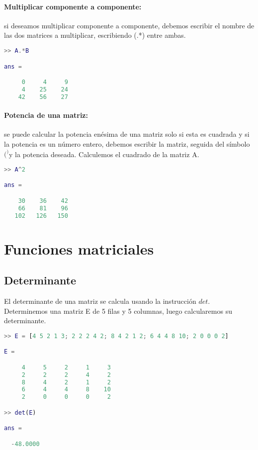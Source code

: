 \paragraph{Multiplicar componente a componente:} si deseamos multiplicar componente a componente, debemos escribir el nombre de las dos matrices a multiplicar, escribiendo (.*) entre ambas.
\begin{lstlisting}[language=Matlab]
>> A.*B

ans =

     0     4     9
     4    25    24
    42    56    27

\end{lstlisting}

\paragraph{Potencia de una matriz:} se puede calcular la potencia enésima de una matriz solo si esta es cuadrada y si la potencia es un número entero, debemos escribir la matriz, seguida del símbolo $(^)$y la potencia deseada. Calculemos el cuadrado de la matriz A.
\begin{lstlisting}[language=Matlab]
>> A^2

ans =

    30    36    42
    66    81    96
   102   126   150

\end{lstlisting}

\section{Funciones matriciales}

\subsection{Determinante}

El determinante de una matriz se calcula usando la instrucción $det$. Determinemos una matriz E de 5 filas y 5 columnas, luego calcularemos su determinante.
\begin{lstlisting}[language=Matlab]
>> E = [4 5 2 1 3; 2 2 2 4 2; 8 4 2 1 2; 6 4 4 8 10; 2 0 0 0 2]

E =

     4     5     2     1     3
     2     2     2     4     2
     8     4     2     1     2
     6     4     4     8    10
     2     0     0     0     2

>> det(E)

ans =

  -48.0000

\end{lstlisting}

